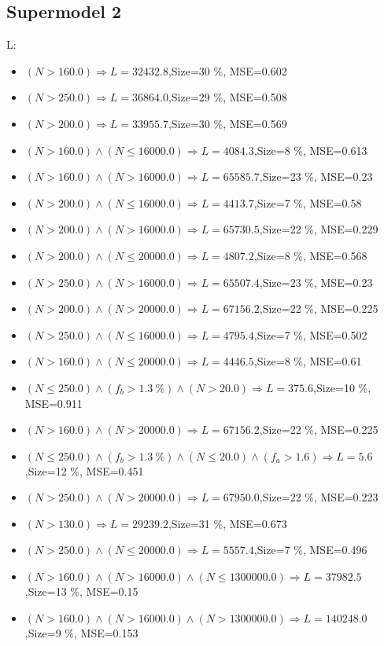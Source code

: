 \documentclass[numbered]{CSL}
\begin{document}
\subsection{Supermodel 2}
L:
\begin{itemize}
\item $(N > 160.0) \Rightarrow L = 32432.8$,\hfill Size=30 \%, MSE=0.602
\item $(N > 250.0) \Rightarrow L = 36864.0$,\hfill Size=29 \%, MSE=0.508
\item $(N > 200.0) \Rightarrow L = 33955.7$,\hfill Size=30 \%, MSE=0.569
\item $(N > 160.0) \land (N \leq 16000.0) \Rightarrow L = 4084.3$,\hfill Size=8 \%, MSE=0.613
\item $(N > 160.0) \land (N > 16000.0) \Rightarrow L = 65585.7$,\hfill Size=23 \%, MSE=0.23
\item $(N > 200.0) \land (N \leq 16000.0) \Rightarrow L = 4413.7$,\hfill Size=7 \%, MSE=0.58
\item $(N > 200.0) \land (N > 16000.0) \Rightarrow L = 65730.5$,\hfill Size=22 \%, MSE=0.229
\item $(N > 200.0) \land (N \leq 20000.0) \Rightarrow L = 4807.2$,\hfill Size=8 \%, MSE=0.568
\item $(N > 250.0) \land (N > 16000.0) \Rightarrow L = 65507.4$,\hfill Size=23 \%, MSE=0.23
\item $(N > 200.0) \land (N > 20000.0) \Rightarrow L = 67156.2$,\hfill Size=22 \%, MSE=0.225
\item $(N > 250.0) \land (N \leq 16000.0) \Rightarrow L = 4795.4$,\hfill Size=7 \%, MSE=0.502
\item $(N > 160.0) \land (N \leq 20000.0) \Rightarrow L = 4446.5$,\hfill Size=8 \%, MSE=0.61
\item $(N \leq 250.0) \land (f_b > 1.3~\%) \land (N > 20.0) \Rightarrow L = 375.6$,\hfill Size=10 \%, MSE=0.911
\item $(N > 160.0) \land (N > 20000.0) \Rightarrow L = 67156.2$,\hfill Size=22 \%, MSE=0.225
\item $(N \leq 250.0) \land (f_b > 1.3~\%) \land (N \leq 20.0) \land (f_a > 1.6) \Rightarrow L = 5.6$,\hfill Size=12 \%, MSE=0.451
\item $(N > 250.0) \land (N > 20000.0) \Rightarrow L = 67950.0$,\hfill Size=22 \%, MSE=0.223
\item $(N > 130.0) \Rightarrow L = 29239.2$,\hfill Size=31 \%, MSE=0.673
\item $(N > 250.0) \land (N \leq 20000.0) \Rightarrow L = 5557.4$,\hfill Size=7 \%, MSE=0.496
\item $(N > 160.0) \land (N > 16000.0) \land (N \leq 1300000.0) \Rightarrow L = 37982.5$,\hfill Size=13 \%, MSE=0.15
\item $(N > 160.0) \land (N > 16000.0) \land (N > 1300000.0) \Rightarrow L = 140248.0$,\hfill Size=9 \%, MSE=0.153
\end{itemize}
\end{document}
